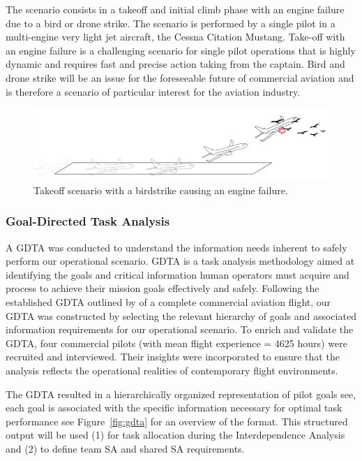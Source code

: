 \documentclass[12pt,a4paper]{article} %
\begin{document}
	The scenario consists in a takeoff and initial climb phase with an engine failure due to a bird or drone strike. The scenario is performed by a single pilot in a multi-engine very light jet aircraft, the Cessna Citation Mustang. Take-off with an engine failure is a challenging scenario for single pilot operations that is highly dynamic and requires fast and precise action taking from the captain. Bird and drone strike will be an issue for the foreseeable future of commercial aviation and is therefore a scenario of particular interest for the aviation industry.

	
	\begin{figure}[H]
 		\centering
  		\includegraphics[width=1\textwidth]{./images/scenario.png}
   		\caption{Takeoff scenario with a birdstrike causing an engine failure.}
		\label{fig:takeoff-scenario-simplified}
	\end{figure}

	\subsubsection{Goal-Directed Task Analysis}
	A GDTA was conducted to understand the information needs inherent to safely perform our operational scenario. GDTA is a task analysis methodology aimed at identifying the goals and critical information human operators must acquire and process to achieve their mission goals effectively and safely.
	Following the established GDTA outlined by \textcite{endsley_designing_2003} of a complete commercial aviation flight, our GDTA was constructed by selecting the relevant hierarchy of goals and associated information requirements for our operational scenario. To enrich and validate the GDTA, four commercial pilots (with mean flight experience = 4625 hours) were recruited and interviewed. Their insights were incorporated to ensure that the analysis reflects the operational realities of contemporary flight environments.

	The GDTA resulted in a hierarchically organized representation of pilot goals see, each goal is associated with the specific information necessary for optimal task performance see Figure~\ref{fig:gdta} for an overview of the format. This structured output  will be used (1) for task allocation during the Interdependence Analysis and (2) to define team SA and shared SA requirements.
	
\end{document}
